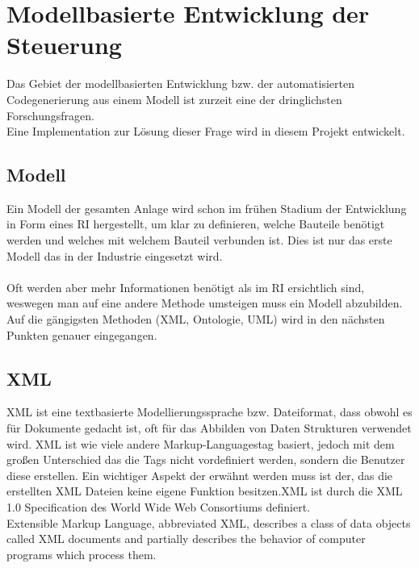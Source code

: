 \newpage

\section{Modellbasierte Entwicklung der Steuerung} \label{modellbasierte_entwicklung}
Das Gebiet der modellbasierten Entwicklung bzw. der automatisierten Codegenerierung aus einem Modell ist zurzeit eine der dringlichsten Forschungsfragen.\\
Eine Implementation zur Lösung dieser Frage wird in diesem Projekt entwickelt.
\subsection{Modell}
Ein Modell der gesamten Anlage wird schon im frühen Stadium der Entwicklung in Form eines \ac{RI} hergestellt, um klar zu definieren, welche Bauteile benötigt werden und welches mit welchem Bauteil verbunden ist. Dies ist nur das erste Modell das in der Industrie eingesetzt wird.\\
\\
Oft werden aber mehr Informationen benötigt als im \ac{RI} ersichtlich sind, weswegen man auf eine andere Methode umsteigen muss ein Modell abzubilden.\\
Auf die gängigsten Methoden (\ac{XML}, Ontologie, \ac{UML}) wird in den nächsten Punkten genauer eingegangen.
\subsection{\ac{XML}}
\ac{XML} ist eine textbasierte Modellierungssprache bzw. Dateiformat, dass obwohl es für Dokumente gedacht ist, oft für das Abbilden von Daten Strukturen verwendet wird. \ac{XML} ist wie viele andere \glqq Markup-Languages\grqq\space tag basiert, jedoch mit dem großen Unterschied das die Tags nicht vordefiniert werden, sondern die Benutzer diese erstellen. Ein wichtiger Aspekt der erwähnt werden muss ist der, das die erstellten \ac{XML} Dateien keine eigene Funktion besitzen.\ac{XML} ist durch die XML 1.0 Specification des World Wide Web Consortiums definiert.\\
\glqq Extensible Markup Language, abbreviated XML, describes a class of data objects called XML documents and partially describes the behavior of computer programs which process them.\grqq \cite{xml_ref}

\newpage


